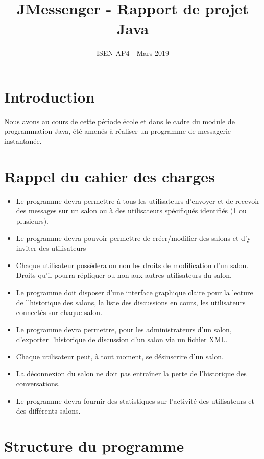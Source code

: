 \documentclass[11pt]{article}
\title{JMessenger - Rapport de projet Java}
\date{ISEN AP4 - Mars 2019}
\begin{document}
\maketitle

\section{Introduction}
    Nous avons au cours de cette période école et dans le cadre du module de programmation Java, été amenés à réaliser
    un programme de messagerie instantanée.

\section{Rappel du cahier des charges}
\begin{itemize}
    \item Le programme devra permettre à tous les utilisateurs d’envoyer et de recevoir des messages sur un salon ou à des utilisateurs spéciﬁqués identiﬁés (1 ou plusieurs).
    \item Le programme devra pouvoir permettre de créer/modiﬁer des salons et d’y inviter des utilisateurs
    \item Chaque utilisateur possèdera ou non les droits de modiﬁcation d’un salon. Droits qu’il pourra répliquer ou non aux autres utilisateurs du salon.
    \item Le programme doit disposer d’une interface graphique claire pour la lecture de l’historique des salons, la liste des discussions en cours, les utilisateurs connectés sur chaque salon.
    \item Le programme devra permettre, pour les administrateurs d’un salon, d’exporter l’historique de discussion d’un salon via un ﬁchier XML.
    \item Chaque utilisateur peut, à tout moment, se désinscrire d’un salon.
    \item La déconnexion du salon ne doit pas entraîner la perte de l’historique des conversations.
    \item Le programme devra fournir des statistiques sur l’activité des utilisateurs et des diﬀérents salons.
\end{itemize}

\section{Structure du programme}
\end{document}
